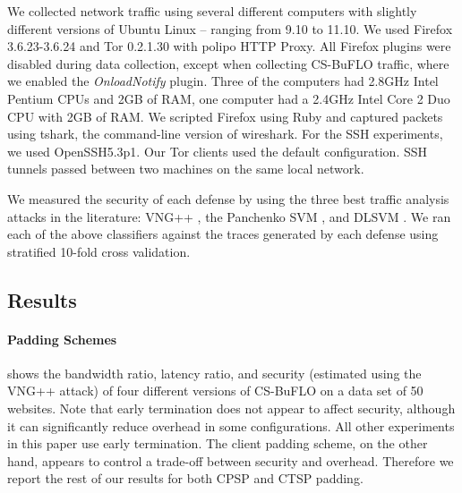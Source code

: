 \documentclass[10pt,journal]{IEEEtran}
\newcommand{\csb} {CS-BuFLO\xspace}
\begin{document}
We collected network traffic using several different computers with
slightly different versions of Ubuntu Linux -- ranging from 9.10 to
11.10.  We used Firefox 3.6.23-3.6.24 and Tor 0.2.1.30 with polipo
HTTP Proxy. All Firefox plugins were disabled during data collection,
except when collecting \csb traffic, where we enabled the
\textit{OnloadNotify} plugin.  Three of the computers had 2.8GHz Intel
Pentium CPUs and 2GB of RAM, one computer had a 2.4GHz Intel Core 2
Duo CPU with 2GB of RAM.  We scripted Firefox using Ruby and captured
packets using tshark, the command-line version of wireshark.  For the
SSH experiments, we used OpenSSH5.3p1. Our Tor clients used the
default configuration. SSH tunnels passed between two machines on the
same local network.

We measured the security of each defense by using the three best
traffic analysis attacks in the literature: VNG++ \cite{dyer-snp12},
the Panchenko SVM \cite{panchenko-wpes11}, and DLSVM
\cite{cai-ccs12}. We ran each of the above classifiers against 
the traces generated by each defense using stratified 10-fold cross 
validation.

\subsection{Results}
\label{subsec:results}





\paragraph*{Padding Schemes}  shows 
the bandwidth ratio, latency ratio, and security (estimated
using the VNG++ attack) of four different versions of \csb on a data
set of 50 websites.  Note that early termination does not appear to
affect security, although it can significantly reduce overhead in some
configurations.  All other experiments in this paper use early
termination.  The client padding scheme, on the other hand, appears to
control a trade-off between security and overhead.  Therefore we
report the rest of our results for both CPSP and CTSP padding.
\end{document}
